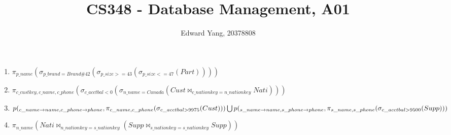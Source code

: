 \documentclass[12pt, oneside]{article}   	%
\title{CS348 - Database Management, A01}
\author{Edward Yang, 20378808}
\begin{document}
\maketitle
\begin{enumerate}
\item $\pi_{p\_name}(\sigma_{p\_brand=Brand\#42} (\sigma_{p\_size >= 43} (\sigma_{p\_size <= 47}(Part))))$
\item $\pi_{c\_custkey, c\_name, c\_phone} (\sigma_{c\_acctbal < 0} (\sigma_{n\_name=Canada}(Cust \Join_{c\_nationkey = n\_nationkey} Nati)))$
\item $p(_{c\_name \to name, c\_phone \to phone},\pi_{c\_name, c\_phone} (\sigma_{c\_acctbal > 9975} (Cust))) \bigcup 
\\ p(_{s\_name \to name, s\_phone \to phone},\pi_{s\_name, s\_phone} (\sigma_{c\_acctbal > 9500} (Supp)))$
\item $\pi_{n\_name}(Nati\Join_{n\_nationkey = s\_nationkey}(Supp\Join_{s\_nationkey=s\_nationkey}Supp))$
\end{enumerate}
\end{document}
